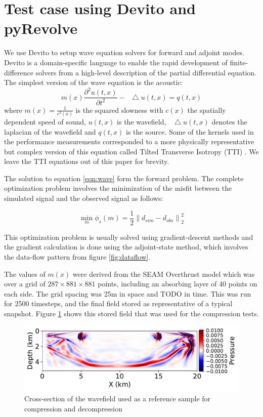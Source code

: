 \documentclass[conference]{IEEEtran}
\newcommand*\Laplace{\mathop{}\!\mathbin\bigtriangleup}
\begin{document}
\section{Test case using Devito and pyRevolve}
We use Devito \cite{devito-compiler} \cite{devito-api} to setup wave equation solvers for forward and
adjoint modes. Devito is a domain-specific language to enable the rapid development of finite-difference
solvers from a high-level description of the partial differential equation. The simplest version of the wave
equation is the acoustic:
\begin{equation}
m(x)\frac{\partial^2 u(t, x)}{\partial t^2} - \Laplace u(t, x) = q(t, x)
\label{eqn:wave}
\end{equation}
where $m(x) = \frac{1}{c^2(x)}$ is the squared slowness with $c(x)$ the spatially dependent speed of sound, 
$u(t, x)$ is the wavefield, $\Laplace u(t, x)$ denotes the laplacian of the wavefield and $q(t, x)$ is the source.
Some of the kernels used in the performance measurements corresponded to a more physically representative
but complex version of this equation called Tilted Transverse Isotropy (TTI) \cite{zhang2011stable}. We leave the 
TTI equations out of this paper for brevity. 

The solution to equation \ref{eqn:wave} form the forward problem. The complete optimization problem involves
the minimization of the misfit between the simulated signal and the observed signal as follows:

\begin{equation}
\min_{m} \phi_s(m) = \frac{1}{2} \left\lVert d_{sim} - d_{obs} \right\rVert_2^2
\end{equation}

This optimization problem is usually solved using gradient-descent methods and the gradient calculation is done
using the adjoint-state method, which involves the data-flow pattern from figure \ref{fig:dataflow}.

The values of $m(x)$ were derived from the SEAM Overthrust model \cite{aminzadeh1996three} which was over a grid
of $287 \times 881 \times 881$ points, including an absorbing layer of 40 points on each side. The grid spacing
was 25m in space and TODO in time. This was run for 2500 timesteps, and the final field stored as
representative of a typical snapshot. Figure \ref{fig:uncompressed} shows this stored field that was used for the compression tests. 

\begin{figure}
\begin{center}
\includegraphics[width=0.8\linewidth]{images/uncompressed.pdf}
\end{center}
\caption{Cross-section of the wavefield used as a reference sample for compression and decompression}
\label{fig:uncompressed}
\end{figure}
\end{document}
